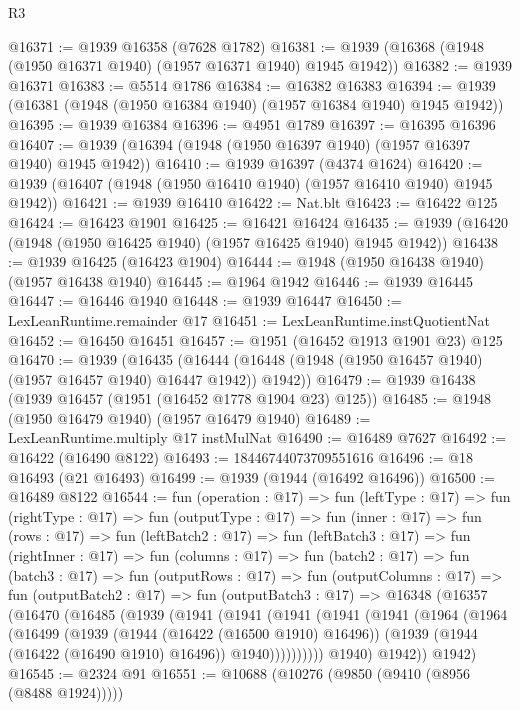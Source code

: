 \begin{lexlean}{R3}
\begin{coremodule}
@16371 := @1939 @16358 (@7628 @1782)
@16381 := @1939 (@16368 (@1948 (@1950 @16371 @1940) (@1957 @16371 @1940) @1945 @1942))
@16382 := @1939 @16371
@16383 := @5514 @1786
@16384 := @16382 @16383
@16394 := @1939 (@16381 (@1948 (@1950 @16384 @1940) (@1957 @16384 @1940) @1945 @1942))
@16395 := @1939 @16384
@16396 := @4951 @1789
@16397 := @16395 @16396
@16407 := @1939 (@16394 (@1948 (@1950 @16397 @1940) (@1957 @16397 @1940) @1945 @1942))
@16410 := @1939 @16397 (@4374 @1624)
@16420 := @1939 (@16407 (@1948 (@1950 @16410 @1940) (@1957 @16410 @1940) @1945 @1942))
@16421 := @1939 @16410
@16422 := Nat.blt
@16423 := @16422 @125
@16424 := @16423 @1901
@16425 := @16421 @16424
@16435 := @1939 (@16420 (@1948 (@1950 @16425 @1940) (@1957 @16425 @1940) @1945 @1942))
@16438 := @1939 @16425 (@16423 @1904)
@16444 := @1948 (@1950 @16438 @1940) (@1957 @16438 @1940)
@16445 := @1964 @1942
@16446 := @1939 @16445
@16447 := @16446 @1940
@16448 := @1939 @16447
@16450 := LexLeanRuntime.remainder @17
@16451 := LexLeanRuntime.instQuotientNat
@16452 := @16450 @16451
@16457 := @1951 (@16452 @1913 @1901 @23) @125
@16470 := @1939
    (@16435 (@16444 (@16448 (@1948 (@1950 @16457 @1940) (@1957 @16457 @1940) @16447 @1942)) @1942))
@16479 := @1939 @16438 (@1939 @16457 (@1951 (@16452 @1778 @1904 @23) @125))
@16485 := @1948 (@1950 @16479 @1940) (@1957 @16479 @1940)
@16489 := LexLeanRuntime.multiply @17 instMulNat
@16490 := @16489 @7627
@16492 := @16422 (@16490 @8122)
@16493 := 18446744073709551616
@16496 := @18 @16493 (@21 @16493)
@16499 := @1939 (@1944 (@16492 @16496))
@16500 := @16489 @8122
@16544 := fun (operation : @17) =>
  fun (leftType : @17) =>
  fun (rightType : @17) =>
  fun (outputType : @17) =>
  fun (inner : @17) =>
  fun (rows : @17) =>
  fun (leftBatch2 : @17) =>
  fun (leftBatch3 : @17) =>
  fun (rightInner : @17) =>
  fun (columns : @17) =>
  fun (batch2 : @17) =>
  fun (batch3 : @17) =>
  fun (outputRows : @17) =>
  fun (outputColumns : @17) =>
  fun (outputBatch2 : @17) =>
  fun (outputBatch3 : @17) =>
  @16348
    (@16357
      (@16470
        (@16485
          (@1939
            (@1941
              (@1941
                (@1941
                  (@1941
                    (@1941
                      (@1964
                        (@1964
                          (@16499
                            (@1939
                              (@1944 (@16422 (@16500 @1910) @16496))
                              (@1939 (@1944 (@16422 (@16490 @1910) @16496)) @1940))))))))))
            @1940)
          @1942))
      @1942)
@16545 := @2324 @91
@16551 := @10688 (@10276 (@9850 (@9410 (@8956 (@8488 @1924)))))

\end{coremodule}
\end{lexlean}
